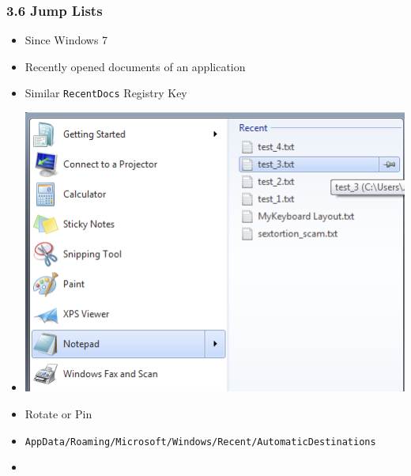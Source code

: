 \begin{frame}[fragile]
  \frametitle{3.6 Jump Lists}
    \begin{itemize}
        \item Since Windows 7
        \item Recently opened documents of an application
	\item Similar \texttt{RecentDocs} Registry Key
	\item[]
        \includegraphics[scale=.3]{images/jl.png}
        \item Rotate or Pin
	\item \scriptsize{\texttt{AppData/Roaming/Microsoft/Windows/Recent/AutomaticDestinations}}
        \item[]
    \end{itemize}
\end{frame}


